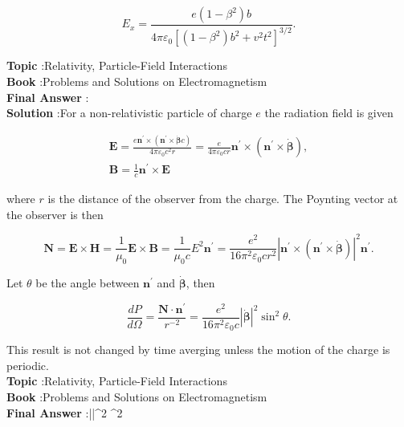 \documentclass[10pt]{article}
\begin{document}
$$
E_{x}=\frac{e\left(1-\beta^{2}\right) b}{4 \pi \varepsilon_{0}\left[\left(1-\beta^{2}\right) b^{2}+v^{2} t^{2}\right]^{3 / 2}} .
$$

\textbf{Topic} :Relativity, Particle-Field Interactions\\
\textbf{Book} :Problems and Solutions on Electromagnetism\\
\textbf{Final Answer} :\\


\textbf{Solution} :For a non-relativistic particle of charge $e$ the radiation field is given

$$
\begin{gathered}
\mathbf{E}=\frac{e \mathbf{n}^{\prime} \times\left(\mathbf{n}^{\prime} \times \dot{\boldsymbol{\beta}} c\right)}{4 \pi \varepsilon_{0} c^{2} r}=\frac{e}{4 \pi \varepsilon_{0} c r} \mathbf{n}^{\prime} \times\left(\mathbf{n}^{\prime} \times \dot{\boldsymbol{\beta}}\right), \\
\mathbf{B}=\frac{1}{c} \mathbf{n}^{\prime} \times \mathbf{E}
\end{gathered}
$$

where $r$ is the distance of the observer from the charge. The Poynting vector at the observer is then

$$
\mathbf{N}=\mathbf{E} \times \mathbf{H}=\frac{1}{\mu_{0}} \mathbf{E} \times \mathbf{B}=\frac{1}{\mu_{0} c} E^{2} \mathbf{n}^{\prime}=\frac{e^{2}}{16 \pi^{2} \varepsilon_{0} c r^{2}}\left|\mathbf{n}^{\prime} \times\left(\mathbf{n}^{\prime} \times \dot{\boldsymbol{\beta}}\right)\right|^{2} \mathbf{n}^{\prime} .
$$

Let $\theta$ be the angle between $\mathbf{n}^{\prime}$ and $\dot{\boldsymbol{\beta}}$, then

$$
\frac{d P}{d \Omega}=\frac{\mathbf{N} \cdot \mathbf{n}^{\prime}}{r^{-2}}=\frac{e^{2}}{16 \pi^{2} \varepsilon_{0} c}|\dot{\boldsymbol{\beta}}|^{2} \sin ^{2} \theta .
$$

This result is not changed by time averging unless the motion of the charge is periodic.
\\
\textbf{Topic} :Relativity, Particle-Field Interactions\\
\textbf{Book} :Problems and Solutions on Electromagnetism\\
\textbf{Final Answer} :|\dot{\boldsymbol{\beta}}|^{2} \sin ^{2} \theta\\
\end{document}

